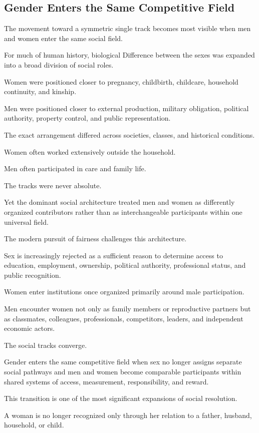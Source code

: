 \subsection*{\textbf{Gender Enters the Same Competitive Field}}

The movement toward a symmetric single track becomes most visible when men and women enter the same social field.

For much of human history, biological Difference between the sexes was expanded into a broad division of social roles.

Women were positioned closer to pregnancy, childbirth, childcare, household continuity, and kinship.

Men were positioned closer to external production, military obligation, political authority, property control, and public representation.

The exact arrangement differed across societies, classes, and historical conditions.

Women often worked extensively outside the household.

Men often participated in care and family life.

The tracks were never absolute.

Yet the dominant social architecture treated men and women as differently organized contributors rather than as interchangeable participants within one universal field.

The modern pursuit of fairness challenges this architecture.

Sex is increasingly rejected as a sufficient reason to determine access to education, employment, ownership, political authority, professional status, and public recognition.

Women enter institutions once organized primarily around male participation.

Men encounter women not only as family members or reproductive partners but as classmates, colleagues, professionals, competitors, leaders, and independent economic actors.

The social tracks converge.

Gender enters the same competitive field when sex no longer assigns separate social pathways and men and women become comparable participants within shared systems of access, measurement, responsibility, and reward.

This transition is one of the most significant expansions of social resolution.

A woman is no longer recognized only through her relation to a father, husband, household, or child.

